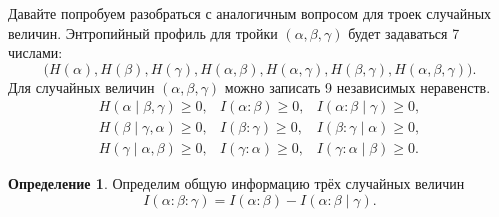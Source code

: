\documentclass[12pt]{article}
\theoremstyle{definition}
\newtheorem{definition}{Определение}[section]
\theoremstyle{plain}
\theoremstyle{remark}
\begin{document}
Давайте попробуем разобраться с аналогичным вопросом для троек случайных
величин. Энтропийный профиль для тройки $(\alpha,\beta,\gamma)$ будет задаваться 7 числами:
\[
\bigl(H(\alpha),H(\beta),H(\gamma),H(\alpha,\beta),H(\alpha,\gamma),
H(\beta,\gamma),H(\alpha,\beta,\gamma)\bigr).
\]
Для случайных величин $(\alpha,\beta,\gamma)$ можно записать 9 независимых
неравенств.
\begin{equation*}
\begin{array}{lll}
H(\alpha\mid\beta,\gamma)\ge 0, & I(\alpha:\beta )\ge 0, & I(\alpha:\beta\mid\gamma) \ge 0,\\
H(\beta\mid\gamma,\alpha)\ge 0, & I(\beta:\gamma )\ge 0, & I(\beta:\gamma\mid\alpha) \ge 0,\\
H(\gamma\mid\alpha,\beta)\ge 0, & I(\gamma:\alpha)\ge 0, & I(\gamma:\alpha\mid\beta) \ge 0.
\end{array}
\end{equation*}
\begin{definition}
Определим общую информацию трёх случайных величин
\[
    I(\alpha:\beta:\gamma) = I(\alpha:\beta) - I(\alpha:\beta\mid\gamma).
\]
\end{definition}
\end{document}
